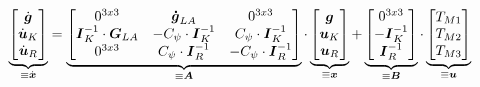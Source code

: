 \begin{equation}
\underbrace{\begin{bmatrix} \dot{\boldsymbol{g}} \\ \dot{\boldsymbol{u}}_K \\ \dot{\boldsymbol{u}}_R \end{bmatrix}}_{\equiv \dot{\boldsymbol{x}}} 
= 
\underbrace{\begin{bmatrix}
0^{3x3} & \boldsymbol{\dot{g}}_{LA} & 0^{3x3} \\
\boldsymbol{I}^{-1}_K \cdot \boldsymbol{G}_{LA} & -C_{\psi}\cdot \boldsymbol{I}^{-1}_K & C_{\psi}\cdot \boldsymbol{I}^{-1}_K \\
0^{3x3} & C_{\psi}\cdot \boldsymbol{I}^{-1}_R & -C_{\psi}\cdot \boldsymbol{I}^{-1}_R
\end{bmatrix}}_{\equiv \boldsymbol{A}}
\cdot
\underbrace{\begin{bmatrix}\boldsymbol{g} \\ \boldsymbol{u}_K \\ \boldsymbol{u}_R\end{bmatrix}}_{\equiv \boldsymbol{x}}
+
\underbrace{\begin{bmatrix}
0^{3x3} \\ -\boldsymbol{I}^{-1}_K \\ \boldsymbol{I}^{-1}_R
\end{bmatrix}}_{\equiv \boldsymbol{B}}
\cdot
\underbrace{\begin{bmatrix}
T_{M1} \\ T_{M2} \\ T_{M3}
\end{bmatrix}}_{\equiv \boldsymbol{u}}
\end{equation}